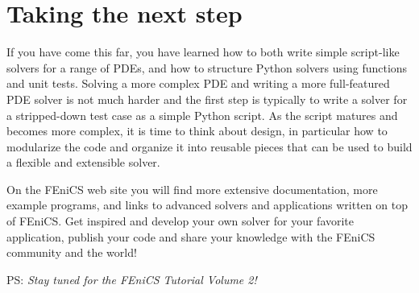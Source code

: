 \documentclass[graybox,envcountchap,sectrefs,final]{svmonodo}
\makeatletter
\def\cleardoublepage{\clearpage\if@twoside \ifodd\c@page\else
\hbox{}
\thispagestyle{empty}
\newpage
\if@twocolumn\hbox{}\newpage\fi\fi\fi}
\makeatother
\begin{document}


\section{Taking the next step}

If you have come this far, you have learned how to both write simple
script-like solvers for a range of PDEs, and how to structure Python
solvers using functions and unit tests. Solving a more complex PDE
and writing a more full-featured PDE solver is not much harder and the
first step is typically to write a solver for a stripped-down test
case as a simple Python script. As the script matures and becomes more
complex, it is time to think about design, in particular how to
modularize the code and organize it into reusable pieces that can be
used to build a flexible and extensible solver.

On the FEniCS web site you will find more extensive documentation,
more example programs, and links to advanced solvers and applications
written on top of FEniCS. Get inspired and develop your own solver
for your favorite application, publish your code and share your
knowledge with the FEniCS community and the world!

PS: \emph{Stay tuned for the FEniCS Tutorial Volume 2!}


\clearemptydoublepage
{}
\thispagestyle{empty}






\backmatter

\cleardoublepage{}  %
\printindex
\end{document}
